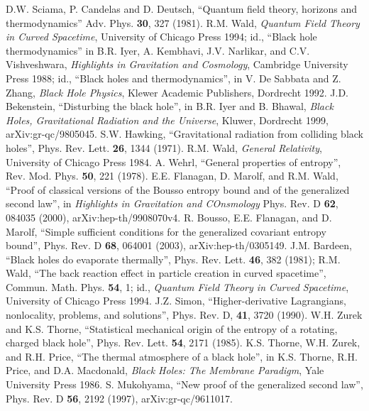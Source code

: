 \documentclass{article}
\begin{document}
\begin{thebibliography}{99}
D.W. Sciama, P. Candelas and D. Deutsch, ``Quantum field theory, horizons and thermodynamics''  Adv. Phys. \textbf{30}, 327 (1981).
R.M. Wald, \textit{Quantum Field Theory in Curved Spacetime}, University of Chicago Press 1994; id., ``Black hole thermodynamics'' in B.R. Iyer, A. Kembhavi, J.V. Narlikar, and C.V. Vishveshwara, \textit{Highlights in Gravitation and Cosmology}, Cambridge University Press 1988; id., ``Black holes and thermodynamics'', in V. De Sabbata and Z. Zhang, \textit{Black Hole Physics}, Klewer Academic Publishers, Dordrecht 1992.
J.D. Bekenstein, ``Disturbing the black hole'', in B.R. Iyer and B. Bhawal, \textit{Black Holes, Gravitational Radiation and the Universe}, Kluwer, Dordrecht 1999, arXiv:gr-qc/9805045.
S.W. Hawking, ``Gravitational radiation from colliding black holes'', Phys. Rev. Lett. \textbf{26}, 1344 (1971).
R.M. Wald, \textit{General Relativity}, University of Chicago Press 1984.
A. Wehrl, ``General properties of entropy'', Rev. Mod. Phys. \textbf{50}, 221 (1978).
E.E. Flanagan, D. Marolf, and R.M. Wald, ``Proof of classical versions of the Bousso entropy bound and of the generalized second law'', in \textit{Highlights in Gravitation and COnsmology}
Phys. Rev. D \textbf{62}, 084035 (2000), arXiv:hep-th/9908070v4.
R. Bousso, E.E. Flanagan, and D. Marolf, ``Simple sufficient conditions for the generalized covariant entropy bound'', Phys. Rev. D \textbf{68}, 064001 (2003), arXiv:hep-th/0305149.
J.M. Bardeen, ``Black holes do evaporate thermally'', Phys. Rev. Lett. \textbf{46}, 382 (1981); R.M. Wald, ``The back reaction effect in particle creation in curved spacetime'', Commun. Math. Phys. \textbf{54}, 1; id., \textit{Quantum Field Theory in Curved Spacetime}, University of Chicago Press 1994.
J.Z. Simon, ``Higher-derivative Lagrangians, nonlocality, problems, and solutions'', Phys. Rev. D, \textbf{41}, 3720 (1990).
W.H. Zurek and K.S. Thorne, ``Statistical mechanical origin of the entropy of a rotating, charged black hole'', Phys. Rev. Lett. \textbf{54}, 2171 (1985).
K.S. Thorne, W.H. Zurek, and R.H. Price, ``The thermal atmosphere of a black hole'', in K.S. Thorne, R.H. Price, and D.A. Macdonald, \textit{Black Holes: The Membrane Paradigm}, Yale University Press 1986.
S. Mukohyama, ``New proof of the generalized second law'', Phys. Rev. D \textbf{56}, 2192 (1997), arXiv:gr-qc/9611017.

\end{thebibliography}
\end{document}
